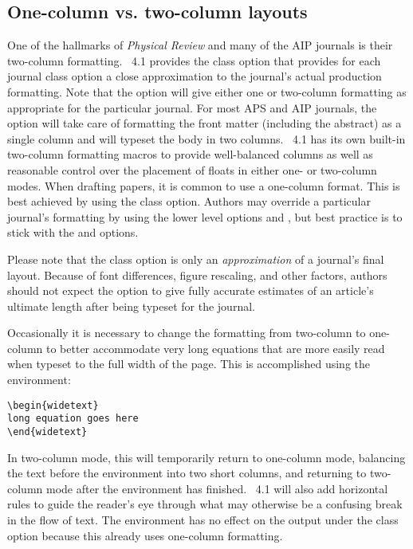 \documentclass[%
,aps%
 ,twocolumn%
 ,secnumarabic%
,amssymb, amsmath,nobibnotes, aps, prl, floatfix]{revtex4-1}
\begin{document}
\subsection{One-column vs. two-column layouts}\label{sec:widetext}

One of the hallmarks of \textit{Physical Review} and many of the AIP journals is their two-column
formatting. \revtex~4.1 provides the  class option that provides for each
journal class option a close approximation to the journal's actual production formatting. Note that
the  option will give either one or two-column formatting as appropriate for the particular journal.
For most APS and AIP journals, the  option will take care of formatting the front matter
(including the abstract) as a single column and will typeset the body in two columns. \revtex~4.1 has its own
built-in two-column formatting macros to provide well-balanced columns as well as reasonable control over the placement of floats in either
one- or two-column modes. When drafting papers, it is common to use a one-column format. This is best achieved by using the
 class option. Authors may override a particular journal's formatting by using the lower level options  and , but best practice is to stick with the  and  options.

Please note that the  class option is only an \textit{approximation} of a journal's final layout. Because of font differences, figure rescaling, and other factors, authors should not expect the  option to give fully accurate estimates of an article's ultimate length after being typeset for the journal.

Occasionally it is necessary to change the formatting from two-column to
one-column to better accommodate very long equations that are more
easily read when typeset to the full width of the page. This is
accomplished using the  environment:
\begin{verbatim}
\begin{widetext}
long equation goes here
\end{widetext}
\end{verbatim}
In two-column mode, this will temporarily return to one-column mode,
balancing the text before the environment into two short columns, and
returning to two-column mode after the environment has
finished. \revtex~4.1 will also add horizontal rules to guide the
reader's eye through what may otherwise be a confusing break in the
flow of text. The
 environment has no effect on the output under the 
 class option because this already uses
one-column formatting.
\end{document}
